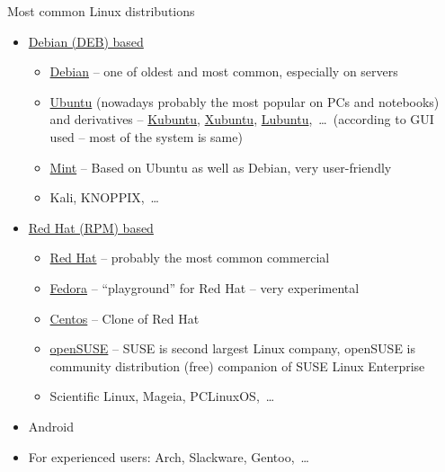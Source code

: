 \documentclass[compress, ucs, xelatex, 11pt, xcolor=svgnames,
  hyperref={
    bookmarks=true,
    unicode=true,
    colorlinks=true,
    pdftitle={Linux, command line and MetaCentrum},
    plainpages=false,
    pdfauthor={Vojtech Zeisek},
    pdfsubject={Course about use of Linux command line, writing shell scripts and using MetaCentrum of CESNET},
    pdfcreator={XeLaTeX},
    pdfkeywords={Linux, GNU, BASH, shell, command line, MetaCentrum},
    linkcolor=Red,
    anchorcolor=Blue,
    citecolor=Purple,
    filecolor=DodgerBlue,
    menucolor=DarkOrchid,
    urlcolor=DeepSkyBlue,
    pdftex},
  url={hyphens, lowtilde} %
  ]{beamer}
\begin{document}
\begin{frame}{Most common Linux distributions}
\begin{itemize}
  \item \href{http://distrowatch.com/search.php?package=DEB}{Debian (DEB) based}
  \begin{itemize}
    \item \href{https://www.debian.org/}{Debian} -- one of oldest and most common, especially on servers
    \item \href{http://www.ubuntu.com/}{Ubuntu} (nowadays probably the most popular on PCs and notebooks) and derivatives -- \href{https://www.kubuntu.org/}{Kubuntu}, \href{https://xubuntu.org/}{Xubuntu}, \href{http://lubuntu.net/}{Lubuntu},~\ldots~(according to GUI used -- most of the system is same)
    \item \href{http://linuxmint.com/}{Mint} -- Based on Ubuntu as well as Debian, very user-friendly
    \item Kali, KNOPPIX,~\ldots
  \end{itemize}
  \item \href{http://distrowatch.com/search.php?package=RPM}{Red Hat (RPM) based}
  \begin{itemize}
    \item \href{https://www.redhat.com/}{Red Hat} -- probably the most common commercial
    \item \href{https://getfedora.org/}{Fedora} -- ``playground'' for Red Hat -- very experimental
    \item \href{https://www.centos.org/}{Centos} -- Clone of Red Hat
    \item \href{https://www.opensuse.org/}{openSUSE} -- SUSE is second largest Linux company, openSUSE is community distribution (free) companion of SUSE Linux Enterprise
    \item Scientific Linux, Mageia, PCLinuxOS,~\ldots
  \end{itemize}
  \item Android
  \item For experienced users: Arch, Slackware, Gentoo,~\ldots
\end{itemize}
\end{frame}
\end{document}
